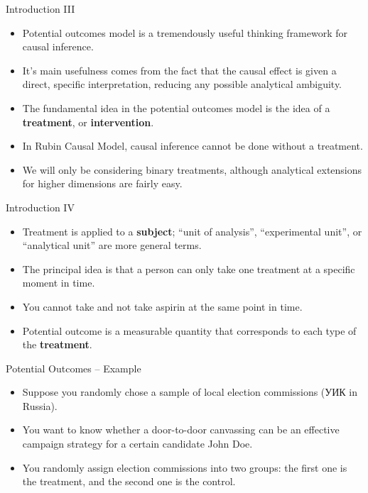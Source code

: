 \documentclass{beamer}
\begin{document}
\begin{frame}{Introduction III}
\begin{itemize}
	\setlength\itemsep{1em}
	\item Potential outcomes model is a tremendously useful thinking framework for causal inference.
	\item It's main usefulness comes from the fact that the causal effect is given a direct, specific interpretation, reducing any possible analytical ambiguity.
	\item The fundamental idea in the potential outcomes model is the idea of a \textbf{treatment}, or \textbf{intervention}.
	\item In Rubin Causal Model, causal inference cannot be done without a treatment. 
	\item We will only be considering binary treatments, although analytical extensions for higher dimensions are fairly easy. 
\end{itemize}
\end{frame}
\begin{frame}{Introduction IV}
\begin{itemize}
	\setlength\itemsep{1em}
	\item Treatment is applied to a \textbf{subject}; ``unit of analysis'', ``experimental unit'', or ``analytical unit'' are more general terms.
	\item The principal idea is that a person can only take one treatment at a specific moment in time. 
	\item You cannot take and not take aspirin at the same point in time. 
	\item Potential outcome is a measurable quantity that corresponds to each type of the \textbf{treatment}.
\end{itemize}
\end{frame}
\begin{frame}{Potential Outcomes -- Example}
	\begin{itemize}
		\setlength\itemsep{2em}
		\item Suppose you randomly chose a sample of local election commissions (УИК in Russia).
		\item You want to know whether a door-to-door canvassing can be an effective campaign strategy for a certain candidate John Doe. 
		\item You randomly assign election commissions into two groups: the first one is the treatment, and the second one is the control.
	\end{itemize}
\end{frame}
\end{document}
